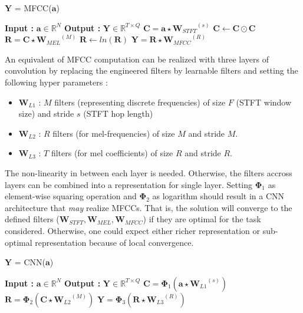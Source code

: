 \begin{algorithm}
  \caption{$\textbf{Y}$ = MFCC($\textbf{a}$) }\label{MFCC_engineer}
  \begin{algorithmic}[1]
    \Statex \textbf{Input :} $\textbf{a} \in \mathbb{R}^{N}$
    \Statex \textbf{Output :} $\textbf{Y} \in \mathbb{R}^{T \times Q}$ 
    \State $\textbf{C} = \textbf{a} \star {\textbf{W}_{STFT}}^{(s)}$ 
    \State $\textbf{C} \leftarrow \textbf{C} \odot \textbf{C}$ 
    \State $\textbf{R} = \textbf{C} \star {\textbf{W}_{MEL}}^{(M)}$ 
    \State $\textbf{R} \leftarrow ln(\textbf{R})$
    \State $\textbf{Y} = \textbf{R} \star {\textbf{W}_{MFCC}}^{(R)}$ 
  \end{algorithmic}
\end{algorithm}
\FloatBarrier
\noindent An equivalent of MFCC computation can be realized with three layers of convolution by replacing the engineered filters by learnable filters and setting the following hyper parameters :
\begin{itemize}
\setlength\itemsep{0em}
\item $\textbf{W}_{L1}$ : $M$ filters (representing discrete frequencies) of size $F$ (STFT window size) and stride $s$ (STFT hop length)
\item $\textbf{W}_{L2}$ : $R$ filters (for mel-frequencies) of size $M$ and stride $M$.
\item $\textbf{W}_{L3}$ : $T$ filters (for mel coefficients) of size $R$ and stride $R$.   
\end{itemize}
The non-linearity in between each layer is needed. Otherwise, the filters accross layers can be combined into a representation for single layer. Setting $\bm{\Phi}_{1}$ as element-wise squaring operation and $\bm{\Phi}_{2}$ as logarithm should result in a CNN architecture that \textit{may} realize MFCCs. That is, the solution will converge to the defined filters ($\textbf{W}_{STFT}, \textbf{W}_{MEL}, \textbf{W}_{MFCC}$) if they are optimal for the task considered. Otherwise, one could expect either richer representation or sub-optimal representation because of local convergence.  
\begin{algorithm}
  \caption{$\textbf{Y}$ = CNN($\textbf{a}$) }\label{MFCC_learn}
  \begin{algorithmic}[1]
    \Statex \textbf{Input :} $\textbf{a} \in \mathbb{R}^{N}$
    \Statex \textbf{Output :} $\textbf{Y} \in \mathbb{R}^{T \times Q}$ 
    \State $\textbf{C} = \bm{\Phi}_{1} (\textbf{a} \star {\textbf{W}_{L1}}^{(s)})$ 
    \State $\textbf{R} = \bm{\Phi}_{2} (\textbf{C} \star {\textbf{W}_{L2}}^{(M)})$ 
    \State $\textbf{Y} = \bm{\Phi}_{3} (\textbf{R} \star {\textbf{W}_{L3}}^{(R)})$ 
  \end{algorithmic}
\end{algorithm}
